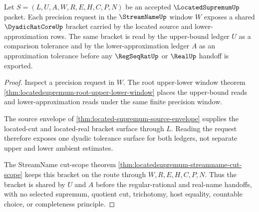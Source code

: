 \begin{theorem}
\label{thm:located-supremum-dyadic-bracket}
Let $S=(L,U,A,W,R,E,H,C,P,N)$ be an accepted $\LocatedSupremumUp$ packet. Each precision request in the $\StreamNameUp$ window $W$ exposes a shared $\DyadicRatCoreUp$ bracket carried by the located source and lower-approximation rows. The same bracket is read by the upper-bound ledger $U$ as a comparison tolerance and by the lower-approximation ledger $A$ as an approximation tolerance before any $\RegSeqRatUp$ or $\RealUp$ handoff is exported.
\end{theorem}
\begin{proof}
Inspect a precision request in $W$. The root upper-lower window theorem \autoref{thm:locatedsupremum-root-upper-lower-window} places the upper-bound reads and lower-approximation reads under the same finite precision window.

The source envelope of \autoref{thm:located-supremum-source-envelope} supplies the located-cut and located-real bracket surface through $L$. Reading the request therefore exposes one dyadic tolerance surface for both ledgers, not separate upper and lower ambient estimates.

The StreamName cut-scope theorem \autoref{thm:locatedsupremum-streamname-cut-scope} keeps this bracket on the route through $W,R,E,H,C,P,N$. Thus the bracket is shared by $U$ and $A$ before the regular-rational and real-name handoffs, with no selected supremum, quotient cut, trichotomy, host equality, countable choice, or completeness principle.
\end{proof}

